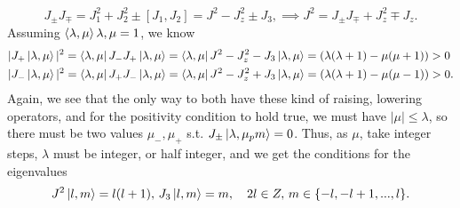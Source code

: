 \begin{equation*}
    J_\pm J_\mp = J_1^2 + J_2^2 \pm [J_1, J_2] = J^2 - J_z^2 \pm J_3, \implies J^2 = J_\pm J_\mp + J_z^2 \mp J_z. 
\end{equation*}
Assuming $\braket{\lambda, \mu}{\lambda, \mu} = 1$, we know
\begin{align*}
    &|J_+ \ket{\lambda, \mu} |^2  
    = \bra{\lambda, \mu} J_- J_+ \ket{\lambda, \mu} 
    = \bra{\lambda, \mu} J^2 - J_z^2 - J_3 \ket{\lambda, \mu} 
    = (\lambda(\lambda + 1)  - \mu(\mu + 1)) > 0 \\
    &|J_- \ket{\lambda, \mu} |^2  
    = \bra{\lambda, \mu} J_+ J_- \ket{\lambda, \mu} 
    = \bra{\lambda, \mu} J^2 - J_z^2 + J_3 \ket{\lambda, \mu} 
    = (\lambda(\lambda + 1)  - \mu(\mu - 1)) > 0.
\end{align*}
Again, we see that the only way to both have these kind of raising, lowering operators, and for the positivity condition to hold true, we must have $|\mu| \leq \lambda$, so there must be two values $\mu_-, \mu_+$ s.t. $J_\pm \ket{\lambda, \mu_pm} = 0$. Thus, as $\mu$, take integer steps, $\lambda$ must be integer, or half integer, and we get the conditions for the eigenvalues
\begin{equation}
    J^2 \ket{l, m} = l(l + 1), \, J_3 \ket{l, m} = m, \quad 2l \in Z,\, m \in \{-l, -l+1, ..., l\}.
\end{equation}

